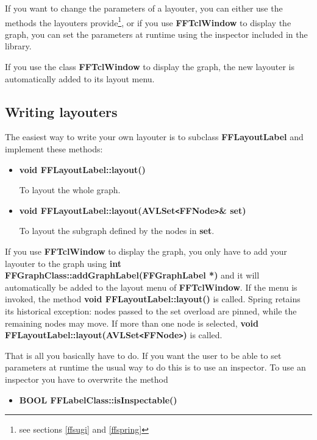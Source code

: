 If you want to change the parameters of a layouter, you can
either use the methods the layouters provide\footnote{see
  sections \vref{ffsugi} and \vref{ffspring}}, or if you use {\bf
  FFTclWindow} to display the graph, you can set the parameters
at runtime using the inspector included in the library.

If you use the class {\bf FFTclWindow} to display the graph, the
new layouter is automatically added to its layout menu.

\subsection{Writing layouters}
\label{writing_layouters}

The easiest way to write your own layouter is to subclass {\bf
  FFLayoutLabel} and implement these methods:

\begin{itemize}

\item{\bf void FFLayoutLabel::layout()}

To layout the whole graph.

\item{\bf void
    FFLayoutLabel::layout(AVLSet\verb|<|FFNode\verb|>|\& set)}

To layout the subgraph defined by the nodes in {\bf set}.

\end{itemize}

If you use {\bf FFTclWindow} to display the graph, you only have
to add your layouter to the graph using {\bf int
  FFGraphClass::addGraphLabel(FFGraphLabel *)} and it will
automatically be added to the layout menu of {\bf FFTclWindow}. If the
menu is invoked, the method {\bf void FFLayoutLabel::layout()}
is called. Spring retains its historical exception: nodes passed to
the set overload are pinned, while the remaining nodes may move. If more than one node is selected, {\bf void
FFLayoutLabel::layout(AVLSet\verb|<|FFNode\verb|>|)} is called.

That is all you basically have to do.  If you want the user to be
able to set parameters at runtime the usual way to do this is
to use an inspector. To use an inspector you have to overwrite
the method

\begin{itemize}
\item{\bf BOOL FFLabelClass::isInspectable()}
\end{itemize}

